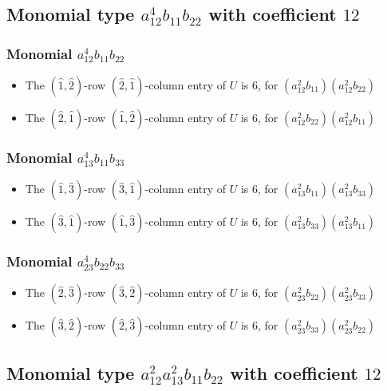\documentclass{article}
\begin{document}
\subsection{Monomial type $ a_{12}^{4} b_{11} b_{22} $ with coefficient $ 12 $}

\subsubsection{Monomial $ a_{12}^{4} b_{11} b_{22} $}

\begin{itemize}
\item The $(\hat{1}, \hat{2})$-row $(\hat{2}, \hat{1})$-column entry of $U$ is $6$, for $( a_{12}^{2} b_{11} )( a_{12}^{2} b_{22} )$ 
\item The $(\hat{2}, \hat{1})$-row $(\hat{1}, \hat{2})$-column entry of $U$ is $6$, for $( a_{12}^{2} b_{22} )( a_{12}^{2} b_{11} )$ 
\end{itemize}
\subsubsection{Monomial $ a_{13}^{4} b_{11} b_{33} $}

\begin{itemize}
\item The $(\hat{1}, \hat{3})$-row $(\hat{3}, \hat{1})$-column entry of $U$ is $6$, for $( a_{13}^{2} b_{11} )( a_{13}^{2} b_{33} )$ 
\item The $(\hat{3}, \hat{1})$-row $(\hat{1}, \hat{3})$-column entry of $U$ is $6$, for $( a_{13}^{2} b_{33} )( a_{13}^{2} b_{11} )$ 
\end{itemize}
\subsubsection{Monomial $ a_{23}^{4} b_{22} b_{33} $}

\begin{itemize}
\item The $(\hat{2}, \hat{3})$-row $(\hat{3}, \hat{2})$-column entry of $U$ is $6$, for $( a_{23}^{2} b_{22} )( a_{23}^{2} b_{33} )$ 
\item The $(\hat{3}, \hat{2})$-row $(\hat{2}, \hat{3})$-column entry of $U$ is $6$, for $( a_{23}^{2} b_{33} )( a_{23}^{2} b_{22} )$ 
\end{itemize}
\subsection{Monomial type $ a_{12}^{2} a_{13}^{2} b_{11} b_{22} $ with coefficient $ 12 $}
\end{document}
